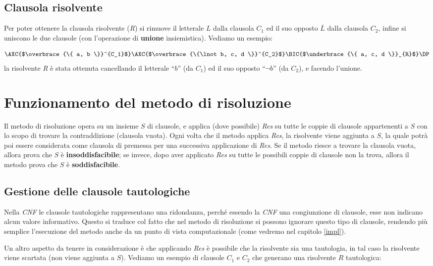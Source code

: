 \documentclass[a4paper,12pt]{report}
\begin{document}
\subsection{Clausola risolvente}
Per poter ottenere la clausola risolvente (\emph{R}) si rimuove il letterale $L$ dalla clausola $C_1$ ed il suo opposto $\overline{L}$ dalla clausola $C_2$, infine si uniscono le due clausole (con l'operazione di \textbf{unione} insiemistica). Vediamo un esempio:

\[
    \AXC{$\overbrace{\{ a, b \}}^{C_1}$}
    \AXC{$\overbrace{\{\lnot b, c, d \}}^{C_2}$}
    \RightLabel{Res}
    \BIC{$\underbrace{\{ a, c, d \}}_{R}$}
    \DP
\]
la risolvente \emph{R} è stata ottenuta cancellando il letterale ``$b$'' (da $C_1$) ed il suo opposto ``$\lnot b$'' (da $C_2$), e facendo l'unione.

\section{Funzionamento del metodo di risoluzione}
Il metodo di risoluzione opera su un insieme $S$ di clausole, e applica (dove possibile) \emph{Res} su tutte le coppie di clausole appartenenti a $S$ con lo scopo di trovare la contraddizione (clausola vuota). Ogni volta che il metodo applica \emph{Res}, la risolvente viene aggiunta a $S$, la quale potrà poi essere considerata come clausola di premessa per una successiva applicazione di \emph{Res}. Se il metodo riesce a trovare la clausola vuota, allora prova che $S$ è \textbf{insoddisfacibile}; se invece, dopo aver applicato \emph{Res} su tutte le possibili coppie di clausole non la trova, allora il metodo prova che $S$ è \textbf{soddisfacibile}.

\subsection{Gestione delle clausole tautologiche}
Nella \emph{CNF} le clausole tautologiche rappresentano una ridondanza, perché essendo la \emph{CNF} una congiunzione di clausole, esse non indicano alcun valore informativo. Questo si traduce col fatto che nel metodo di risoluzione si possono ignorare questo tipo di clausole, rendendo più semplice l'esecuzione del metodo anche da un punto di vista computazionale (come vedremo nel capitolo \ref{impl}).

Un altro aspetto da tenere in considerazione è che applicando \emph{Res} è possibile che la risolvente sia una tautologia, in tal caso la risolvente viene scartata (non viene aggiunta a $S$). Vediamo un esempio di clausole $C_1$ e $C_2$ che generano una risolvente $R$ tautologica:
\end{document}
